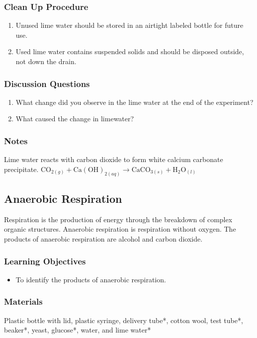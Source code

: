 \subsubsection*{Clean Up Procedure}
\begin{enumerate}
\item{Unused lime water should be stored in an airtight labeled bottle for future use.}
\item{Used lime water contains suspended solids and should be disposed outside, not down the drain.}
\end{enumerate}

\subsubsection*{Discussion Questions}
\begin{enumerate}
\item{What change did you observe in the lime water at the end of the experiment?}
\item{What caused the change in limewater?}
\end{enumerate}

\subsubsection*{Notes}
Lime water reacts with carbon dioxide to form white calcium carbonate precipitate.
$\mathrm{CO}_{2(g)} + \mathrm{Ca(OH)}_{2(aq)} \longrightarrow \mathrm{CaCO}_{3(s)} + \mathrm{H}_2\mathrm{O}_{(l)}$

\subsection{Anaerobic Respiration}

Respiration is the production of energy through the breakdown of complex organic structures. Anaerobic respiration is respiration without oxygen. The products of anaerobic respiration are alcohol and carbon dioxide.

\subsubsection*{Learning Objectives}
\begin{itemize}
\item{To identify the products of anaerobic respiration.}
\end{itemize}

\subsubsection*{Materials}
Plastic bottle with lid, plastic syringe, delivery tube*, cotton wool, test tube*, beaker*, yeast, glucose*, water, and lime water*

